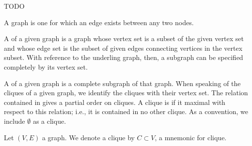 
\sbasic










\sstart
{}

TODO


A
graph is one
for which an edge exists
between any two nodes.

A
of a given graph
is a graph whose
vertex set is a subset
of the given vertex set
and whose edge set is the
subset of given edges connecting
vertices in the vertex subset.
With reference to the underling
graph, then, a subgraph can be
specified completely by its
vertex set.

A 
of a given graph
is a complete subgraph
of that graph.
When speaking of the cliques
of a given graph, we identify
the cliques with their vertex
set.
The relation contained in
gives a partial order on
cliques.
A clique is
if it maximal with
respect to this relation;
i.e., it is contained
in no other clique.
As a convention, we include
$\emptyset$ as a clique.


Let $(V, E)$ a graph.
We denote a clique
by $C \subset V$,
a mnemonic for clique.
\strats

